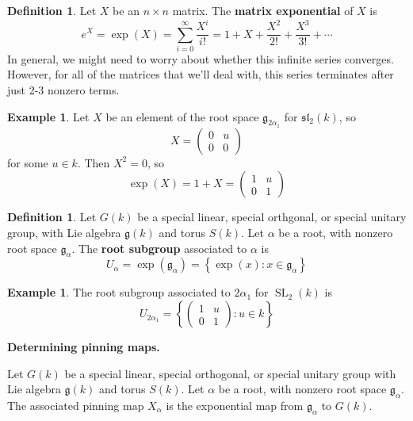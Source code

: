 \documentclass[12pt]{article}
\theoremstyle{definition}
\newtheorem{definition}[theorem]{Definition}
\newtheorem{example}[theorem]{Example}
\numberwithin{theorem}{subsection}
\newcommand{\lb}{\left\{}
\newcommand{\rb}{\right\}}
\newcommand{\tbf}{\textbf}
\newcommand{\noi}{\noindent}
\newcommand{\frakg}{\mathfrak{g}}
\newcommand{\fraksl}{\mathfrak{sl}}
\DeclareMathOperator{\SL}{SL}
\begin{document}
\begin{definition}
Let $X$ be an $n \times n$ matrix. The \tbf{matrix exponential} of $X$ is
\[
	e^X = \exp(X) = \sum_{i=0}^\infty \frac{X^i}{i!} = 1 + X + \frac{X^2}{2!} + \frac{X^3}{3!} + \cdots
\]
In general, we might need to worry about whether this infinite series converges. However, for all of the matrices that we'll deal with, this series terminates after just 2-3 nonzero terms.
\end{definition}

\begin{example}
Let $X$ be an element of the root space $\frakg_{2\alpha_1}$ for $\fraksl_2(k)$, so
\[
	X = 	\begin{pmatrix}
		0 & u \\
		0 & 0 
	\end{pmatrix}
\]
for some $u \in k$. Then $X^2 = 0$, so
\[
	\exp(X) = 1 + X =
	\begin{pmatrix}
		1 & u \\
		0 & 1 
	\end{pmatrix}
\]
\end{example}

\begin{definition}
Let $G(k)$ be a special linear, special orthgonal, or special unitary group, with Lie algebra $\frakg(k)$ and torus $S(k)$. Let $\alpha$ be a root, with nonzero root space $\frakg_\alpha$. The \tbf{root subgroup} associated to $\alpha$ is
\[
	U_\alpha = \exp (\frakg_\alpha) = \lb \exp(x) : x \in \frakg_\alpha \rb
\]
\end{definition}

\begin{example}
The root subgroup associated to $2\alpha_1$ for $\SL_2(k)$ is
\[
	U_{2\alpha_1} =
	\lb
	\begin{pmatrix}
		1 & u \\
		0 & 1 
	\end{pmatrix}
	: u \in k
	\rb
\]
\end{example}

\begin{framed}
\noi \tbf{Determining pinning maps.} 

\noi Let $G(k)$ be a special linear, special orthogonal, or special unitary group with Lie algebra $\frakg(k)$ and torus $S(k)$. Let $\alpha$ be a root, with nonzero root space $\frakg_\alpha$. The associated pinning map $X_\alpha$ is the exponential map from $\frakg_\alpha$ to $G(k)$.
\end{framed}
\end{document}
